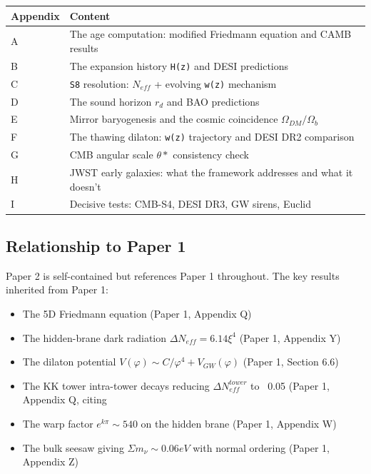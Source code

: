 \documentclass[aps,prd,preprint,superscriptaddress,longbibliography]{revtex4-2}
\begin{document}
\begin{table}[H]
\begin{ruledtabular}
\begin{tabular}{p{7.5cm}p{7.5cm}}
Appendix & Content \\
\hline
A & The age computation: modified Friedmann equation and CAMB results \\
B & The expansion history \texttt{H(z)} and DESI predictions \\
C & \texttt{S8} resolution: $N_{eff}$ + evolving \texttt{w(z)} mechanism \\
D & The sound horizon $r_d$ and BAO predictions \\
E & Mirror baryogenesis and the cosmic coincidence $\Omega_{DM}/\Omega_b$ \\
F & The thawing dilaton: \texttt{w(z)} trajectory and DESI DR2 comparison \\
G & CMB angular scale $\theta*$ consistency check \\
H & JWST early galaxies: what the framework addresses and what it doesn't \\
I & Decisive tests: CMB-S4, DESI DR3, GW sirens, Euclid \\
\end{tabular}
\end{ruledtabular}
\end{table}


\subsection{Relationship to Paper 1}

Paper 2 is self-contained but references Paper 1 throughout. The key results inherited from Paper 1:


\begin{itemize}
  \item The 5D Friedmann equation (Paper 1, Appendix Q)
  \item The hidden-brane dark radiation $\Delta N_{eff} = 6.14\xi^{4}$ (Paper 1, Appendix Y)
  \item The dilaton potential $V(\varphi) \sim  C/\varphi^{4} + V_{GW}(\varphi)$ (Paper 1, Section 6.6)
  \item The KK tower intra-tower decays reducing $\Delta N_{eff}^{tower}$ to ~0.05 (Paper 1, Appendix Q, citing \cite{GonzaloNeutrinoTowers2024}
  \item The warp factor $e^{k\pi} \sim  540$ on the hidden brane (Paper 1, Appendix W)
  \item The bulk seesaw giving $\Sigma m_\nu \sim  0.06 eV$ with normal ordering (Paper 1, Appendix Z)
\end{itemize}
\end{document}
